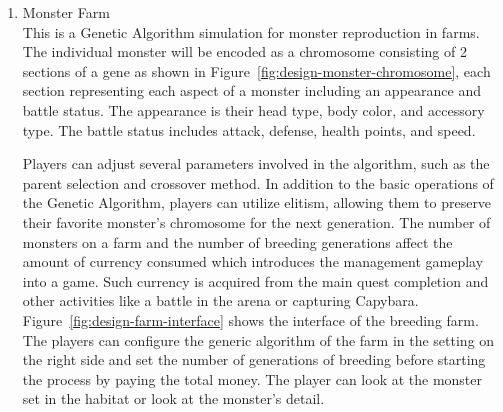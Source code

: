 \documentclass[12pt,oneside,openright,a4paper]{cpe-english-project}
\begin{document}
\begin{itemize}
\begin{itemize}
		\begin{enumerate}
		\item Monster Farm \\
		This is a Genetic Algorithm simulation for monster reproduction in farms. The individual monster will be encoded as a chromosome consisting of 2 sections of a gene as shown in Figure~\ref{fig:design-monster-chromosome}, each section representing each aspect of a monster including an appearance and battle status. The appearance is their head type, body color, and accessory type. The battle status includes attack, defense, health points, and speed. \\
		\begin{minipage}[c]{\textwidth}\centering
		\label{fig:design-monster-chromosome}
		\end{minipage}
		Players can adjust several parameters involved in the algorithm, such as the parent selection and crossover method. In addition to the basic operations of the Genetic Algorithm, players can utilize elitism, allowing them to preserve their favorite monster's chromosome for the next generation. The number of monsters on a farm and the number of breeding generations affect the amount of currency consumed which introduces the management gameplay into a game. Such currency is acquired from the main quest completion and other activities like a battle in the arena or capturing Capybara. Figure~\ref{fig:design-farm-interface} shows the interface of the breeding farm. The players can configure the generic algorithm of the farm in the setting on the right side and set the number of generations of breeding before starting the process by paying the total money. The player can look at the monster set in the habitat or look at the monster's detail. \\
		\begin{minipage}[c]{\textwidth}\centering
		\label{fig:design-farm-interface}
		\end{minipage}


\end{enumerate}
\end{itemize}
\end{itemize}
\end{document}
